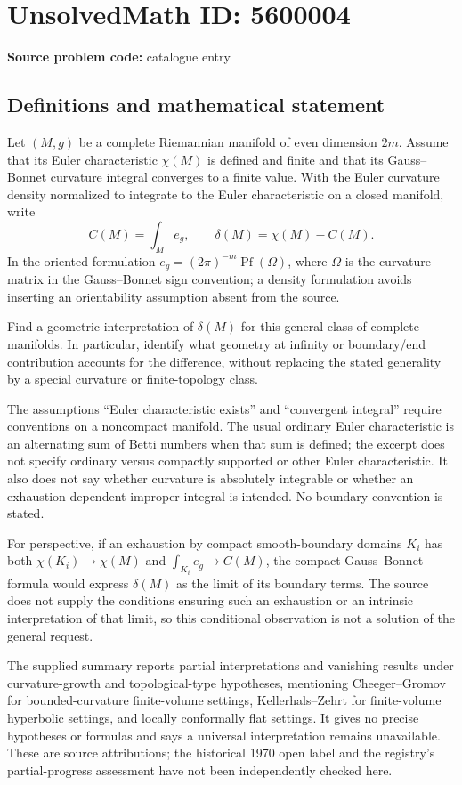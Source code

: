 \documentclass[11pt]{article}
\begin{document}
\section*{UnsolvedMath ID: 5600004}
\textbf{Source problem code:} catalogue entry
\subsection{Definitions and mathematical statement}
Let \((M,g)\) be a complete Riemannian manifold of even dimension \(2m\). Assume that its Euler characteristic \(\chi(M)\) is defined and finite and that its Gauss--Bonnet curvature integral converges to a finite value. With the Euler curvature density normalized to integrate to the Euler characteristic on a closed manifold, write
\[
 C(M)=\int_M e_g,\qquad \delta(M)=\chi(M)-C(M).
\]
In the oriented formulation \(e_g=(2\pi)^{-m}\operatorname{Pf}(\Omega)\), where \(\Omega\) is the curvature matrix in the Gauss--Bonnet sign convention; a density formulation avoids inserting an orientability assumption absent from the source.

Find a geometric interpretation of \(\delta(M)\) for this general class of complete manifolds. In particular, identify what geometry at infinity or boundary/end contribution accounts for the difference, without replacing the stated generality by a special curvature or finite-topology class.

The assumptions ``Euler characteristic exists'' and ``convergent integral'' require conventions on a noncompact manifold. The usual ordinary Euler characteristic is an alternating sum of Betti numbers when that sum is defined; the excerpt does not specify ordinary versus compactly supported or other Euler characteristic. It also does not say whether curvature is absolutely integrable or whether an exhaustion-dependent improper integral is intended. No boundary convention is stated.

For perspective, if an exhaustion by compact smooth-boundary domains \(K_i\) has both \(\chi(K_i)\to\chi(M)\) and \(\int_{K_i}e_g\to C(M)\), the compact Gauss--Bonnet formula would express \(\delta(M)\) as the limit of its boundary terms. The source does not supply the conditions ensuring such an exhaustion or an intrinsic interpretation of that limit, so this conditional observation is not a solution of the general request.

The supplied summary reports partial interpretations and vanishing results under curvature-growth and topological-type hypotheses, mentioning Cheeger--Gromov for bounded-curvature finite-volume settings, Kellerhals--Zehrt for finite-volume hyperbolic settings, and locally conformally flat settings. It gives no precise hypotheses or formulas and says a universal interpretation remains unavailable. These are source attributions; the historical 1970 open label and the registry's partial-progress assessment have not been independently checked here.
\end{document}
